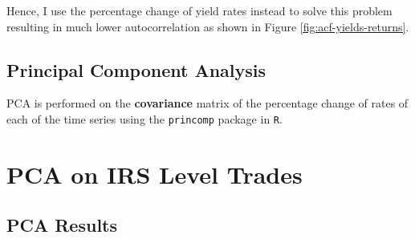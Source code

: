 \documentclass[11pt]{scrreprt}
\begin{document}
Hence, I use the percentage change of yield rates instead to solve this problem resulting in much lower autocorrelation as shown in Figure \ref{fig:acf-yields-returns}.

\section{Principal Component Analysis}

PCA is performed on the \textbf{covariance} matrix of the percentage change of rates of each of the time series using the \texttt{princomp} package in \texttt{R}.

\chapter{PCA on IRS Level Trades}

\section{PCA Results}
\end{document}
